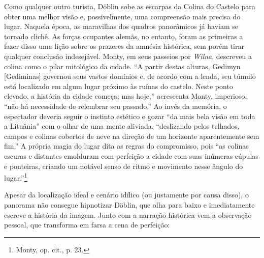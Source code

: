 Como qualquer outro turista, Döblin sobe as escarpas da Colina do
Castelo para obter uma melhor visão e, possivelmente, uma compreensão
mais precisa do lugar. Naquela época, as maravilhas dos quadros
panorâmicos já haviam se tornado clichê. As forças ocupantes alemãs, no
entanto, foram as primeiras a fazer disso uma lição sobre os prazeres da
amnésia histórica, sem porém tirar qualquer conclusão indesejável.
Monty, em seus passeios por \textit{Wilna}, descreveu a colina como o pilar
mitológico da cidade. ``A partir destas alturas, Gedimyn {[}Gediminas{]}
governou seus vastos domínios e, de acordo com a lenda, seu túmulo está
localizado em algum lugar próximo às ruínas do castelo. Neste ponto
elevado, a história da cidade começa; mas hoje,'' acrescenta Monty,
imperioso, ``não há necessidade de relembrar seu passado.'' Ao invés da
memória, o espectador deveria seguir o instinto estético e gozar ``da
mais bela visão em toda a Lituânia'' com o olhar de uma mente aliviada,
``deslizando pelos telhados, campos e colinas cobertos de neve na
direção de um horizonte aparentemente sem fim.'' A própria magia do
lugar dita as regras do compromisso, pois ``as colinas escuras e
distantes emolduram com perfeição a cidade com suas inúmeras cúpulas e
ponteiras, criando um notável senso de ritmo e movimento nesse ângulo do
lugar.''\footnote{Monty, op. cit., p. 23.}

%

Apesar da localização ideal e cenário idílico (ou justamente por causa
disso), o panorama não consegue hipnotizar Döblin, que olha para baixo e
imediatamente escreve a história da imagem. Junto com a narração
histórica vem a observação pessoal, que transforma em farsa a cena de
perfeição:

